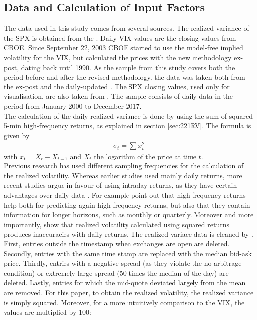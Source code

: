 \subsection{Data and Calculation of Input Factors}\label{sec:41Data}
The data used in this study comes from several sources. The realized variance of the \ac{SPX} is obtained from the \textcite{Oxford:RV}. Daily \ac{VIX} values are the closing values from \ac{CBOE}. Since September 22, 2003 \ac{CBOE} started to use the model-free implied volatility for the \ac{VIX}, but calculated the prices with the new methodology ex-post, dating back until 1990. As the sample from this study covers both the period before and after the revised methodology, the data was taken both from the ex-post \textcite{CBOE:old} and the daily-updated \textcite{CBOE:new}. The \ac{SPX} closing values, used only for visualisation, are also taken from \textcite{SandP}. The sample consists of daily data in the period from January 2000 to December 2017. \\
The calculation of the daily realized variance is done by \textcite{Oxford:RV} using the sum of squared 5-min high-frequency returns, as explained in section \ref{sec:221RV}. The formula is given by 
\begin{align}
\sigma_{t} = \sum x_{t}^{2}
\end{align}
with $x_{t} = X_{t} - X_{t-1}$ and $X_{t}$ the logarithm of the price at time $t$. \\%
Previous research has used different sampling frequencies for the calculation of the realized volatility. Whereas earlier studies used mainly daily returns, more recent studies argue in favour of using intraday returns, as they have certain advantages over daily data \parencite{jiang2003}. For example \textcite{andersen2003} point out that high-frequency returns help both for predicting again high-frequency returns, but also that they contain information for longer horizons, such as monthly or quarterly. Moreover and more importantly, \textcite{andersen1998} show that realized volatility calculated using squared returns produces inaccuracies with daily returns. The realized variace data is cleaned by \textcite{Oxford:RV}. First, entries outside the timestamp when exchanges are open are deleted. Secondly, entries with the same time stamp are replaced with the median bid-ask price. Thirdly, entries with a negative spread (as they violate the no-arbitrage condition) or extremely large spread (50 times the median of the day) are deleted. Lastly, entries for which the mid-quote deviated largely from the mean are removed. For this paper, to obtain the realized volatility, the realized variance is simply squared. Moreover, for a more intuitively comparison to the \ac{VIX}, the values are multiplied by 100:

